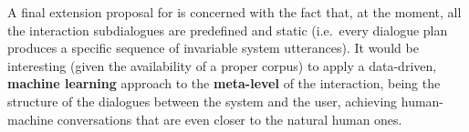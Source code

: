 
A final extension proposal for \pname is concerned with the fact that, at the moment, all the interaction subdialogues are predefined and static (i.e.\ every dialogue plan produces a specific sequence of invariable system utterances). It would be interesting (given the availability of a proper corpus) to apply a data-driven, \textbf{machine learning} approach to the \textbf{meta-level} of the interaction, being the structure of the dialogues between the system and the user, achieving human-machine conversations that are even closer to the natural human ones.



